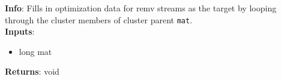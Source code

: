 \textbf{Info}: Fills in optimization data for remv streams as the target by
looping through the cluster members of cluster parent \texttt{mat}. \\

\noindent \textbf{Inputs}:
\begin{itemize}
\item{long mat}
\end{itemize}

\noindent \textbf{Returns}: void
